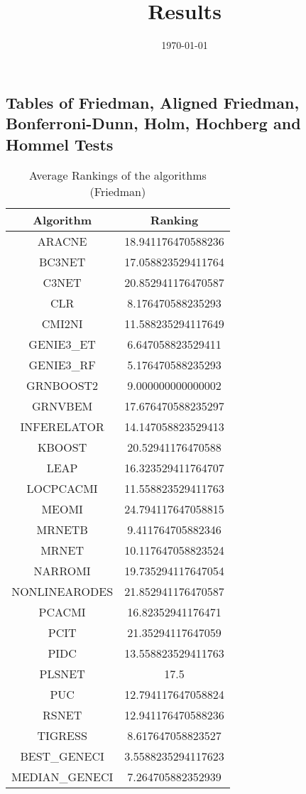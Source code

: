 \documentclass[a4paper,10pt]{article}
\title{Results}
\author{}
\date{\today}
\begin{document}
\begin{landscape}
\oddsidemargin 0in \topmargin 0in\maketitle
\section{Tables of Friedman, Aligned Friedman, Bonferroni-Dunn, Holm, Hochberg and Hommel Tests}
\begin{table}[!htp]
\centering
\caption{Average Rankings of the algorithms (Friedman)
}\begin{tabular}{c|c}
Algorithm&Ranking\\
\hline
ARACNE&18.941176470588236\\
BC3NET&17.058823529411764\\
C3NET&20.852941176470587\\
CLR&8.176470588235293\\
CMI2NI&11.588235294117649\\
GENIE3_ET&6.647058823529411\\
GENIE3_RF&5.176470588235293\\
GRNBOOST2&9.000000000000002\\
GRNVBEM&17.676470588235297\\
INFERELATOR&14.147058823529413\\
KBOOST&20.52941176470588\\
LEAP&16.323529411764707\\
LOCPCACMI&11.558823529411763\\
MEOMI&24.794117647058815\\
MRNETB&9.411764705882346\\
MRNET&10.117647058823524\\
NARROMI&19.735294117647054\\
NONLINEARODES&21.852941176470587\\
PCACMI&16.82352941176471\\
PCIT&21.35294117647059\\
PIDC&13.558823529411763\\
PLSNET&17.5\\
PUC&12.794117647058824\\
RSNET&12.941176470588236\\
TIGRESS&8.617647058823527\\
BEST_GENECI&3.5588235294117623\\
MEDIAN_GENECI&7.264705882352939\\
\end{tabular}
\end{table}



\end{landscape}
\end{document}
